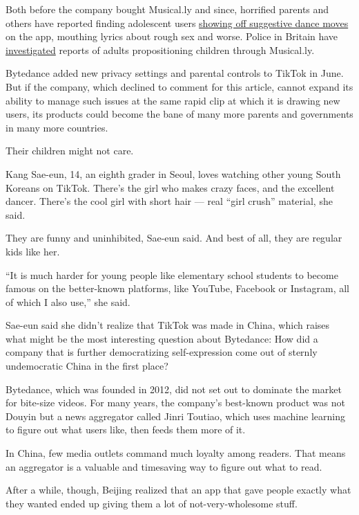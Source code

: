 Both before the company bought Musical.ly and since, horrified parents
and others have reported finding adolescent users
\href{https://medium.com/s/parenting-stories/porn-is-not-the-worst-thing-on-musical-ly-5df07ab842af}{showing
off suggestive dance moves} on the app, mouthing lyrics about rough sex
and worse. Police in Britain have
\href{http://www.edp24.co.uk/news/crime/police-investigation-after-two-children-from-eastgate-academy-in-king-s-lynn-allegedly-groomed-on-musical-ly-app-1-5036808}{investigated}
reports of adults propositioning children through Musical.ly.

Bytedance added new privacy settings and parental controls to TikTok in
June. But if the company, which declined to comment for this article,
cannot expand its ability to manage such issues at the same rapid clip
at which it is drawing new users, its products could become the bane of
many more parents and governments in many more countries.

Their children might not care.

Kang Sae-eun, 14, an eighth grader in Seoul, loves watching other young
South Koreans on TikTok. There's the girl who makes crazy faces, and the
excellent dancer. There's the cool girl with short hair --- real ``girl
crush'' material, she said.

They are funny and uninhibited, Sae-eun said. And best of all, they are
regular kids like her.

``It is much harder for young people like elementary school students to
become famous on the better-known platforms, like YouTube, Facebook or
Instagram, all of which I also use,'' she said.

Sae-eun said she didn't realize that TikTok was made in China, which
raises what might be the most interesting question about Bytedance: How
did a company that is further democratizing self-expression come out of
sternly undemocratic China in the first place?

Bytedance, which was founded in 2012, did not set out to dominate the
market for bite-size videos. For many years, the company's best-known
product was not Douyin but a news aggregator called Jinri Toutiao, which
uses machine learning to figure out what users like, then feeds them
more of it.

In China, few media outlets command much loyalty among readers. That
means an aggregator is a valuable and timesaving way to figure out what
to read.

After a while, though, Beijing realized that an app that gave people
exactly what they wanted ended up giving them a lot of
not-very-wholesome stuff.

